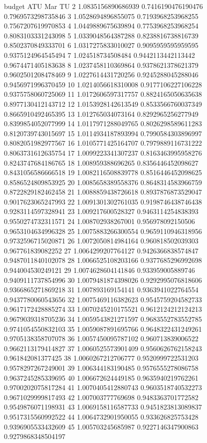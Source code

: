 budget	ATU	Mar	TU
2	1.0835156890686939	0.7416190476190476	0.7969573298735846
3	1.0528694896855075	0.7193968253968255	0.7567207619970853
4	1.0449889675639894	0.7753968253968254	0.8083103331243098
5	1.0339048564387288	0.8238816738816739	0.8502370849333701
6	1.0317275833010027	0.9095959595959595	0.9375124964545494
7	1.024518734508484	0.9442113442113442	0.9674471405183638
8	1.0237458110369864	0.9378621378621379	0.9602501208478469
9	1.0227614431720256	0.9245288045288046	0.9456971996370459
10	1.0214056618310008	0.9177106227106228	0.9375758060725069
11	1.0172606597317757	0.8824165050635638	0.8977130412143712
12	1.0153928142613549	0.8533566760037349	0.8665910492465395
13	1.012765034073164	0.8292965256277949	0.8399854052077999
14	1.0117971288049765	0.8026298589611283	0.8120739743015697
15	1.0114934187893994	0.7990584303896997	0.8082051982977567
16	1.0105771425164707	0.7979889116731222	0.8063731612635754
17	1.0099223341307237	0.8163463995958276	0.8243747684186765
18	1.008959388696265	0.8356446452098627	0.8431056586666518
19	1.0082116508839778	0.8516446452098625	0.8586524809853925
20	1.0085658389558376	0.8648314583966759	0.8722829182462458
21	1.0088859438726618	0.8937876873529047	0.9017623065247993
22	1.0091301302761035	0.9198746438746438	0.9283114597328941
23	1.009217600528327	0.9463114254838393	0.9550274732311571
24	1.008702938267001	0.956978092150506	0.9653104634996328
25	1.0075883266300554	0.9659110946318956	0.9732596715020871
26	1.0072050814984164	0.960818502039303	0.967761839082252
27	1.0064299207764127	0.9426366838574847	0.9487011840102078
28	1.0066525108203166	0.9377685296992698	0.944004530249121
29	1.0074628604141846	0.933959005889746	0.9409111737854996
30	1.0079481874398026	0.9292995076818606	0.9366865271869218
31	1.007893169154141	0.9363941022764554	0.9437780060543656
32	1.0075469116382623	0.9545759204582733	0.9617172428885274
33	1.0070245210175521	0.9612124212124213	0.9679039318705236
34	1.0059543821271597	0.9683552783552785	0.9741054550832103
35	1.0059087891695766	0.9648322431249261	0.9705138358707078
36	1.0057450095787102	0.960713839006522	0.9662113179414827
37	1.0060525573901409	0.9560626762158243	0.961842081377425
38	1.0060267212706777	0.9520999722531203	0.9578297267249001
39	1.006344183190485	0.9576555278086758	0.9637245285339695
40	1.006672624449185	0.9635940219762261	0.9700202075817284
41	1.0070405412880743	0.9603518740532273	0.9671029999817493
42	1.007003777769698	0.9483363701772582	0.9549876071198931
43	1.0069158116587733	0.9451823813089837	0.9517315560992522
44	1.0064732901950055	0.933626825753428	0.9396905533432609
45	1.005703245685987	0.9227146347900863	0.9279868348504197
